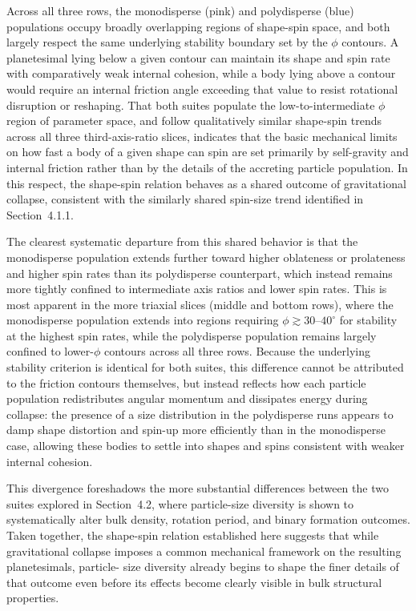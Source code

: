 \documentclass[fleqn,usenatbib]{mnras}
\begin{document}
Across all three rows, the monodisperse (pink) and polydisperse (blue)
populations occupy broadly overlapping regions of shape-spin space,
and both largely respect the same underlying stability boundary set by
the $\phi$ contours. A planetesimal lying below a given contour can
maintain its shape and spin rate with comparatively weak internal
cohesion, while a body lying above a contour would require an internal
friction angle exceeding that value to resist rotational disruption or
reshaping. That both suites populate the low-to-intermediate $\phi$
region of parameter space, and follow qualitatively similar
shape-spin trends across all three third-axis-ratio slices, indicates
that the basic mechanical limits on how fast a body of a given shape
can spin are set primarily by self-gravity and internal friction
rather than by the details of the accreting particle population. In
this respect, the shape-spin relation behaves as a shared outcome of
gravitational collapse, consistent with the similarly shared
spin-size trend identified in Section~4.1.1.

The clearest systematic departure from this shared behavior is that
the monodisperse population extends further toward higher oblateness
or prolateness and higher spin rates than its polydisperse
counterpart, which instead remains more tightly confined to
intermediate axis ratios and lower spin rates. This is most apparent
in the more triaxial slices (middle and bottom rows), where the
monodisperse population extends into regions requiring
$\phi \gtrsim 30$--$40^\circ$ for stability at the highest spin rates,
while the polydisperse population remains largely confined to
lower-$\phi$ contours across all three rows. Because the underlying
stability criterion is identical for both suites, this difference
cannot be attributed to the friction contours themselves, but instead
reflects how each particle population redistributes angular momentum
and dissipates energy during collapse: the presence of a size
distribution in the polydisperse runs appears to damp shape distortion
and spin-up more efficiently than in the monodisperse case, allowing
these bodies to settle into shapes and spins consistent with weaker
internal cohesion.

This divergence foreshadows the more substantial differences between
the two suites explored in Section~4.2, where particle-size diversity
is shown to systematically alter bulk density, rotation period, and
binary formation outcomes. Taken together, the shape-spin relation
established here suggests that while gravitational collapse imposes a
common mechanical framework on the resulting planetesimals, particle-
size diversity already begins to shape the finer details of that
outcome even before its effects become clearly visible in bulk
structural properties.
\end{document}
